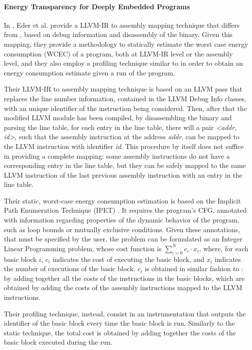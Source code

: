 \paragraph{Energy Transparency for Deeply Embedded Programs}
In \cite{eder}, Eder et al. provide a LLVM-IR to assembly mapping technique that differs from \cite{brando2011}, based on debug information and disassembly of the binary. Given this mapping, they provide a methodology to statically estimate the worst case energy consumption (WCEC) of a program, both at LLVM-IR level or the assembly level, and they also employ a profiling technique similar to \cite{brando2011} in order to obtain an energy consumption estimate given a run of the program. \par 
Their LLVM-IR to assembly mapping technique is based on an LLVM pass that replaces the line number information, contained in the LLVM Debug Info classes, with an unique identifier of the instruction being considered. Then, after that the modified LLVM module has been compiled, by disassembling the binary and parsing the line table, for each entry in the line table, there will a pair \emph{<addr, id>}, such that the assembly instruction at the address \emph{addr}, can be mapped to the LLVM instruction with identifier \emph{id}.
\newline This procedure by itself does not suffice in providing a complete mapping: some assembly instructions do not have a corresponding entry in the line table, but they can be safely mapped to the same LLVM instruction of the last previous assembly instruction with an entry in the line table. \par 
Their static, worst-case energy consumption estimation is based on the Implicit Path Enumeration Technique (IPET) \cite{ipet}. It requires the program's CFG, annotated with information regarding properties of the dynamic behavior of the program, such as loop bounds or mutually exclusive conditions.
Given these annotations, that must be specified by the user, the problem can be formulated as an Integer Linear Programming problem, whose cost function is $\sum_{i=0}^{N} c_{i} \cdot x_{i}$, where, for each basic block $i$, $c_{i}$ indicates the cost of executing the basic block, and $x_{i}$ indicates the number of executions of the basic block. $c_{i}$ is obtained in similar fashion to \cite{brando2011}: by adding together all the costs of the instructions in the basic blocks, which are obtained by adding the costs of the assembly instructions mapped to the LLVM instructions. \par 
Their profiling technique, instead, consist in an instrumentation that outputs the identifier of the basic block every time the basic block is run. Similarly to the static technique, the total cost is obtained by adding together the costs of the basic block executed during the run.


